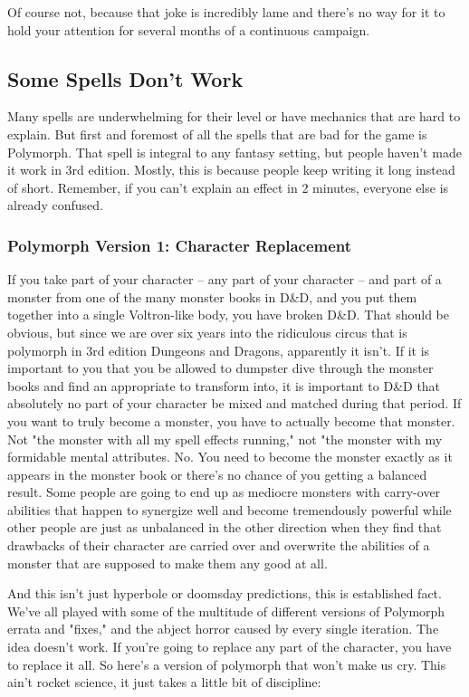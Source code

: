 Of course not, because that joke is incredibly lame and there's no way for it to hold your attention for several months of a continuous campaign.

\subsection{Some Spells Don't Work}

Many spells are underwhelming for their level or have mechanics that are hard to explain. But first and foremost of all the spells that are bad for the game is Polymorph. That spell is integral to any fantasy setting, but people haven't made it work in 3rd edition. Mostly, this is because people keep writing it long instead of short. Remember, if you can't explain an effect in 2 minutes, everyone else is already confused.

\subsubsection{Polymorph Version 1: Character Replacement}

If you take part of your character -- any part of your character -- and part of a monster from one of the many monster books in D\&D, and you put them together into a single Voltron-like body, you have broken D\&D. That should be obvious, but since we are over six years into the ridiculous circus that is polymorph in 3rd edition Dungeons and Dragons, apparently it isn't. If it is important to you that you be allowed to dumpster dive through the monster books and find an appropriate to transform into, it is important to D\&D that absolutely no part of your character be mixed and matched during that period. If you want to truly become a monster, you have to actually become that monster. Not "the monster with all my spell effects running," not "the monster with my formidable mental attributes. No. You need to become the monster exactly as it appears in the monster book or there's no chance of you getting a balanced result. Some people are going to end up as mediocre monsters with carry-over abilities that happen to synergize well and become tremendously powerful while other people are just as unbalanced in the other direction when they find that drawbacks of their character are carried over and overwrite the abilities of a monster that are supposed to make them any good at all.

And this isn't just hyperbole or doomsday predictions, this is established fact. We've all played with some of the multitude of different versions of Polymorph errata and "fixes," and the abject horror caused by every single iteration. The idea doesn't work. If you're going to replace any part of the character, you have to replace it all. So here's a version of polymorph that won't make us cry. This ain't rocket science, it just takes a little bit of discipline:


